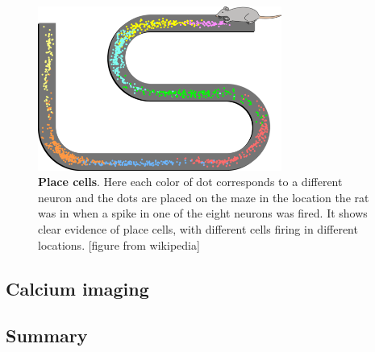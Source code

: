 \documentclass[12pt]{article}
\begin{document}
\begin{figure}
  \begin{center}
    \includegraphics[width=8cm]{place_cells.png}
    \end{center}
  \caption{\textbf{Place cells}. Here each color of dot corresponds to a different neuron and the dots are placed on the maze in the location the rat was in when a spike in one of the eight neurons was fired. It shows clear evidence of place cells, with different cells firing in different locations. [figure from wikipedia]\label{fig:place}}
\end{figure}

\subsection*{Calcium imaging}



\subsection*{Summary}
\end{document}
